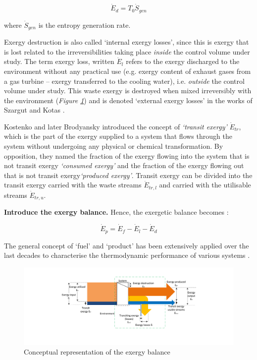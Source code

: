 	\begin{equation}
		\dot{E}_d=T_0\dot{S}_{gen}
	\end{equation}
	
	where $\dot{S}_{gen}$ is the entropy generation rate.

Exergy destruction is also called `internal exergy losses', since this is exergy that is lost related to the irreversibilities taking place \emph{inside} the control volume under study. The term exergy loss, written $\dot{E}_l$ \cite{BejanAdrian;TsatsaronisGeorge;Moran1996} refers to the exergy discharged to the environment without any practical use (e.g. exergy content of exhaust gases from a gas turbine -- exergy transferred to the cooling water), i.e. \emph{outside} the control volume under study. This waste exergy is destroyed when mixed irreversibly with the environment (\emph{Figure \ref{fig:balance}}) and is denoted `external exergy losses' in the works of Szargut and Kotas \cite{Szargut1998,Kotas1995}. 

Kostenko \cite{Kostenko1983} and later Brodyansky \cite{Brodyansky1994} introduced the concept of \emph{`transit exergy'} $\dot{E}_{tr}$, which is the part of the exergy supplied to a system that flows through the system without undergoing any physical or chemical transformation. By opposition, they named the fraction of the exergy flowing into the system that is not transit exergy \emph{`consumed exergy'} and the fraction of the exergy flowing out that is not transit exergy\emph{`produced exergy'}. Transit exergy can be divided into the transit exergy carried with the waste streams $\dot{E}_{tr,l}$ and carried with the utilisable streams $\dot{E}_{tr,u}$. 


\textbf{Introduce the exergy balance.}
Hence, the exergetic balance becomes \cite{BejanAdrian;TsatsaronisGeorge;Moran1996,Tsatsaronis2007}:

\begin{equation}
\dot{E}_p=\dot{E}_f-\dot{E}_l-\dot{E}_d
\end{equation}
		
The general concept of `fuel' and `product' has been extensively applied over the last decades to characterise the thermodynamic performance of various systems \cite{Tsatsaronis1985,Thermoeconomics2001,BejanAdrian;TsatsaronisGeorge;Moran1996,Tsatsaronis1993}. 

\begin{figure}[htbp]
	\centering
	\includegraphics[width=\linewidth]{balance.pdf}
	\caption{Conceptual representation of the exergy balance}
	\label{fig:balance}
\end{figure}
	
